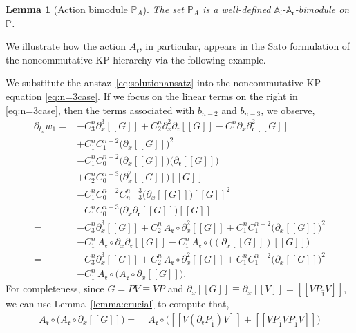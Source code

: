 \documentclass[5p,twocolumn]{elsarticle}
\newcommand*{\pa}{{\partial}}
\newcommand*{\lb}{[\![}
\newcommand*{\rb}{]\!]}
\newcommand*{\el}{\mathfrak l}
\newcommand*{\rl}{\mathfrak r}
\newtheorem{lemma}[theorem]{Lemma}
\begin{document}
%
\begin{lemma}[Action bimodule $\mathbb{P}_A$]
  The set $\mathbb{P}_A$ is a well-defined $\mathbb{A}_{\el}$-$\mathbb{A}_{\rl}$-bimodule on $\mathbb{P}$.
\end{lemma}
%
We illustrate how the action $A_{\rl}$, in particular, appears in the Sato formulation of the noncommutative KP hierarchy via the following example.
%
\begin{example}\label{ex:n=3revisited}
  We substitute the anstaz~\eqref{eq:solutionansatz} into the noncommutative KP equation \eqref{eq:n=3case}.
  If we focus on the linear terms on the right in \eqref{eq:n=3case}, then the terms associated with $b_{n-2}$ and $b_{n-3}$, we observe,
  \begin{align}
    \pa_{t_n}w_1\!=&-C_{3}^n\pa_x^3\lb G\rb+C_{2}^n\pa_x^2\pa_\rl\lb G\rb-C_{1}^n\pa_x\pa_\rl^2\lb G\rb\nonumber\\
                &+C_{1}^nC_{1}^{n-2}\bigl(\pa_x\lb G\rb\bigr)^2\nonumber\\
                &-C_{1}^nC_{0}^{n-2}\bigl(\pa_x\lb G\rb\bigr)\bigl(\pa_\rl\lb G\rb\bigr)\nonumber\\
                &+C_{2}^{n}C_{0}^{n-3}\bigl(\pa_x^2\lb G\rb\bigr)\lb G\rb\nonumber\\
                &-C_{1}^nC_{0}^{n-2}C_{n-3}^{n-3}\bigl(\pa_x\lb G\rb\bigr)\lb G\rb^2\nonumber\\
                &-C_{1}^{n}C_{0}^{n-3}\bigl(\pa_x\pa_\rl\lb G\rb\bigr)\lb G\rb\nonumber\\
               =&-C_{3}^n\pa_x^3\lb G\rb\!+\!C_{2}^n\,A_{\rl}\circ\pa_x^2\lb G\rb\!+\!C_{1}^nC_{1}^{n-2}\bigl(\pa_x\lb G\rb\bigr)^2\nonumber\\
                &-C_{1}^n\,A_{\rl}\circ\pa_x\pa_\rl\lb G\rb\!-\!C_{1}^n\,A_{\rl}\circ\bigl((\pa_x\lb G\rb)\lb G\rb\bigr)\nonumber\\
               =&-C_{3}^n\pa_x^3\lb G\rb\!+\!C_{2}^n\,A_{\rl}\circ\pa_x^2\lb G\rb\!+\!C_{1}^nC_{1}^{n-2}\bigl(\pa_x\lb G\rb\bigr)^2\nonumber\\
                &-C_{1}^n\,A_{\rl}\circ\bigl(A_{\rl}\circ\pa_x\lb G\rb\bigr).\label{eq:begright}
  \end{align}
  For completeness, since $G=PV\equiv VP$ and $\pa_x\lb G\rb\equiv\pa_x\lb V\rb=\lb VP_{\hat{1}}V\rb$, we can use Lemma~\ref{lemma:crucial} to compute that,
  \begin{align}
    A_{\rl}\circ\bigl(A_{\rl}\circ\pa_x\lb G\rb\bigr)=&\;A_{\rl}\circ\bigl(\lb V(\pa_\rl P_{\hat{1}})V\rb+\lb VP_{\hat{1}}VP_{\hat{1}}V\rb\bigr)\nonumber\\

\end{align}
\end{example}
\end{document}
